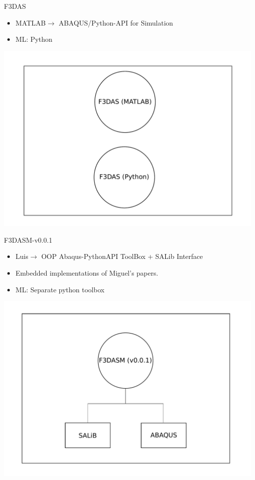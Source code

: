 \documentclass[aspectratio=169]{beamer}
\begin{document}
\begin{frame}{F3DAS}
  \begin{minipage}{0.5\textwidth}
  \begin{itemize}
    \item MATLAB$\to$ ABAQUS/Python-API for Simulation
    \item ML: Python 
  \end{itemize}
  \end{minipage}%
  \begin{minipage}{0.5\textwidth}
    \includegraphics[width=\textwidth]{Figures/F3DAS.pdf}
  \end{minipage}
\end{frame}

\begin{frame}{F3DASM-v0.0.1}
  \begin{minipage}{0.5\textwidth}
  \begin{itemize}
    \item Luis$\to$ OOP Abaqus-PythonAPI ToolBox + SALib Interface
    \item Embedded implementations of Miguel's papers.
    \item ML: Separate python toolbox
  \end{itemize}
  \end{minipage}%
  \begin{minipage}{0.5\textwidth}
    \includegraphics[width=\textwidth]{Figures/F3DASMv001.pdf}
  \end{minipage}
\end{frame}
\end{document}
